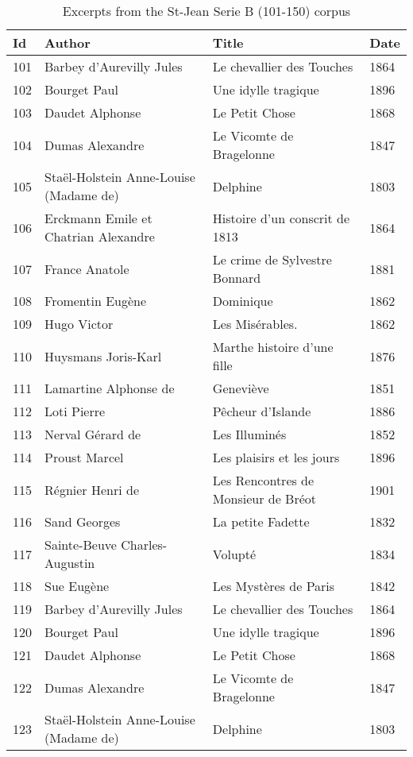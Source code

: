 \begin{table}[H]
  \caption{Excerpts from the St-Jean Serie B (101-150) corpus}
  \label{tbl:st_jean_corpus_3}
  \begin{tabular}{l l l l}
    \toprule
    \textbf{Id} &
    \textbf{Author} &
    \textbf{Title} &
    \textbf{Date} \\
    \midrule
    101 & Barbey d'Aurevilly Jules & Le chevallier des Touches & 1864 \\
    102 & Bourget Paul & Une idylle tragique & 1896 \\
    103 & Daudet Alphonse & Le Petit Chose & 1868 \\
    104 & Dumas Alexandre & Le Vicomte de Bragelonne & 1847 \\
    105 & Staël-Holstein Anne-Louise (Madame de) & Delphine & 1803 \\
    106 & Erckmann Emile et Chatrian Alexandre & Histoire d’un conscrit de 1813 & 1864 \\
    107 & France Anatole & Le crime de Sylvestre Bonnard & 1881 \\
    108 & Fromentin Eugène & Dominique & 1862 \\
    109 & Hugo Victor & Les Misérables. & 1862 \\
    110 & Huysmans Joris-Karl & Marthe histoire d’une fille & 1876 \\
    111 & Lamartine Alphonse de & Geneviève & 1851 \\
    112 & Loti Pierre & Pêcheur d’Islande & 1886 \\
    113 & Nerval Gérard de & Les Illuminés & 1852 \\
    114 & Proust Marcel & Les plaisirs et les jours & 1896 \\
    115 & Régnier Henri de & Les Rencontres de Monsieur de Bréot & 1901 \\
    116 & Sand Georges & La petite Fadette & 1832 \\
    117 & Sainte-Beuve Charles-Augustin & Volupté & 1834 \\
    118 & Sue Eugène & Les Mystères de Paris & 1842 \\
    119 & Barbey d'Aurevilly Jules & Le chevallier des Touches & 1864 \\
    120 & Bourget Paul & Une idylle tragique & 1896 \\
    121 & Daudet Alphonse & Le Petit Chose & 1868 \\
    122 & Dumas Alexandre & Le Vicomte de Bragelonne & 1847 \\
    123 & Staël-Holstein Anne-Louise (Madame de) & Delphine & 1803 \\

\end{tabular}
\end{table}
